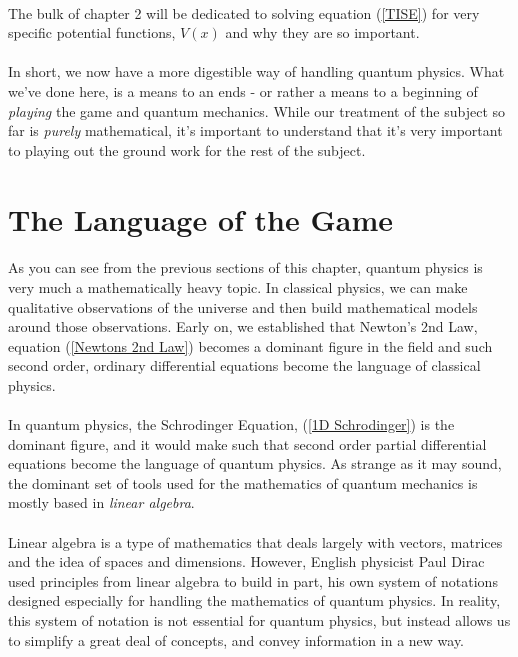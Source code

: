 \documentclass[12pt,letterpaper]{book}
\begin{document}
\paragraph*{}The bulk of chapter 2 will be dedicated to solving equation (\ref{TISE}) for very specific potential functions, $V(x)$ and why they are so important. 
\paragraph*{}In short, we now have a more digestible way of handling quantum physics. What we've done here, is a means to an ends - or rather a means to a beginning of \textit{playing} the game and quantum mechanics. While our treatment of the subject so far is \textit{purely} mathematical, it's important to understand that it's very important to playing out the ground work for the rest of the subject. 


\section{The Language of the Game}
\paragraph*{}As you can see from the previous sections of this chapter, quantum physics is very much a mathematically heavy topic. In classical physics, we can make qualitative observations of the universe and then build mathematical models around those observations. Early on, we established that Newton's 2nd Law, equation (\ref{Newtons 2nd Law}) becomes a dominant figure in the field and such second order, ordinary differential equations become the language of classical physics.
\paragraph*{}In quantum physics, the Schrodinger Equation, (\ref{1D Schrodinger}) is the dominant figure, and it would make such that second order partial differential equations become the language of quantum physics. As strange as it may sound, the dominant set of tools used for the mathematics of quantum mechanics is mostly based in \textit{linear algebra}.
\paragraph*{}Linear algebra is a type of mathematics that deals largely with vectors, matrices and the idea of spaces and dimensions. However, English physicist Paul Dirac used principles from linear algebra to build in part, his own system of notations designed especially for handling the mathematics of quantum physics. In reality, this system of notation is not essential for quantum physics, but instead allows us to simplify a great deal of concepts, and convey information in a new way.
\end{document}
